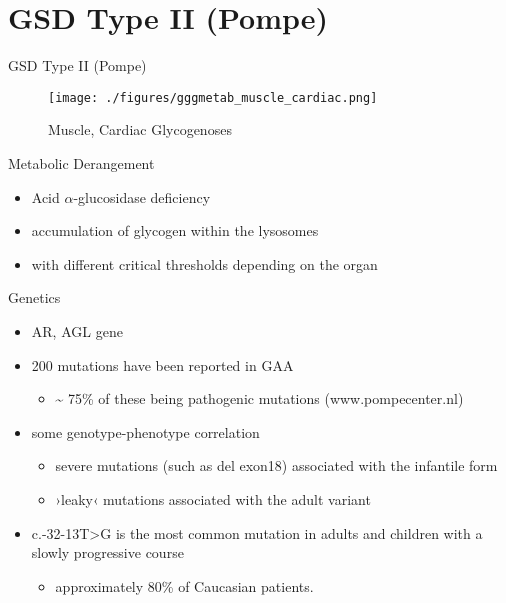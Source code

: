 \documentclass[presentation, smaller]{beamer}
\begin{document}
\section{GSD Type II (Pompe)}
\label{sec:org8de2675}
\begin{frame}[label={sec:org0797d98}]{GSD Type II (Pompe)}
\begin{figure}[htbp]
\centering
\texttt{[image: ./figures/gggmetab\_muscle\_cardiac.png]}
\caption[Muscle, Cardiac Glycogenoses]{\label{fig:orge918d3b}
Muscle, Cardiac Glycogenoses}
\end{figure}
\end{frame}

\begin{frame}[label={sec:org66370d3}]{Metabolic Derangement}
\begin{itemize}
\item Acid \(\alpha\)-glucosidase deficiency
\item accumulation of glycogen within the lysosomes
\item with different critical thresholds depending on the organ
\end{itemize}
\end{frame}

\begin{frame}[label={sec:org6c3e4e4}]{Genetics}
\begin{itemize}
\item AR, AGL gene
\item 200 mutations have been reported in GAA
\begin{itemize}
\item \textasciitilde{} 75\% of these being pathogenic mutations (www.pompecenter.nl)
\end{itemize}
\item some genotype-phenotype correlation
\begin{itemize}
\item severe mutations (such as del exon18) associated with the infantile form
\item ›leaky‹ mutations associated with the adult variant
\end{itemize}
\item c.-32-13T>G is the most common mutation in adults and children with
a slowly progressive course
\begin{itemize}
\item approximately 80\% of Caucasian patients.
\end{itemize}
\end{itemize}
\end{frame}
\end{document}
